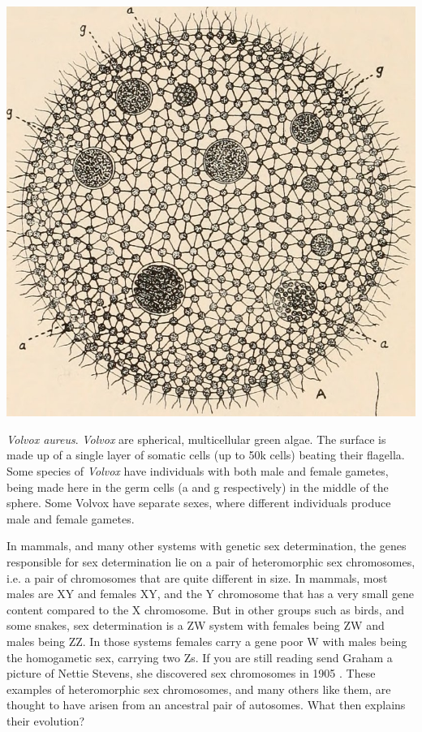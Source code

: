   \begin{marginfigure}[-6cm]
\begin{center}
\includegraphics[width = \textwidth]{illustration_images/multiple_sel_loci/volvox/volvox.jpg}
\end{center}
\caption{ {\it Volvox aureus}. {\it Volvox} are spherical, multicellular green algae. The surface is made up of a single layer of somatic cells (up to 50k cells) beating their flagella. Some species of {\it Volvox} have individuals with both male and female gametes, being made here in the germ cells (a and g respectively) in the middle of the sphere. Some Volvox have separate sexes, where different individuals produce male and female gametes.}
\end{marginfigure}
In mammals, and many other systems with genetic sex determination, the genes responsible for sex determination lie on a pair of heteromorphic sex chromosomes, i.e. a pair of chromosomes that are quite different in size. In mammals, most males are XY and females XY, and the Y chromosome that has a very small gene content compared to the X chromosome. But in other groups such as birds, and some snakes, sex determination is a ZW system with females being ZW and males being ZZ. In those systems females carry a gene poor W with males being the homogametic sex, carrying two Zs.  If you are still reading send Graham a picture of Nettie Stevens, she discovered sex chromosomes in 1905 \citep{stevens1905studies}. These examples of heteromorphic sex chromosomes, and many others like them, are thought to have arisen from an ancestral pair of autosomes. What then explains their evolution? %

